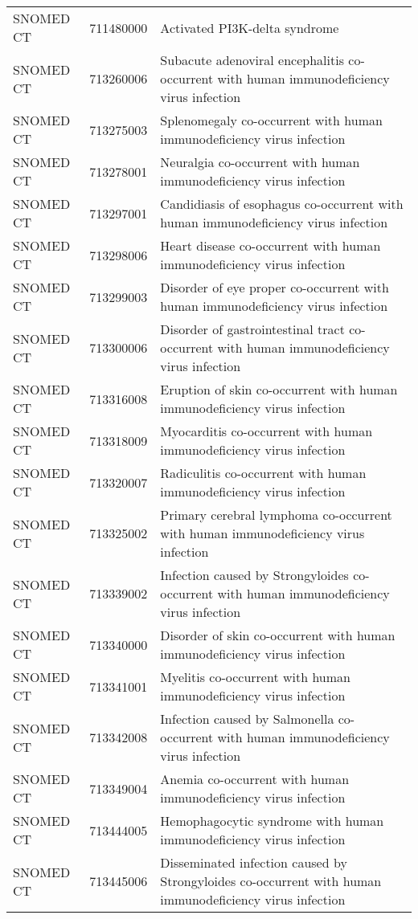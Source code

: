 \begin{table}[ht]
\begin{tabular}{lll}
  SNOMED CT & 711480000 & Activated PI3K-delta syndrome \\ 
  SNOMED CT & 713260006 & Subacute adenoviral encephalitis co-occurrent with human immunodeficiency virus infection \\ 
  SNOMED CT & 713275003 & Splenomegaly co-occurrent with human immunodeficiency virus infection \\ 
  SNOMED CT & 713278001 & Neuralgia co-occurrent with human immunodeficiency virus infection \\ 
  SNOMED CT & 713297001 & Candidiasis of esophagus co-occurrent with human immunodeficiency virus infection \\ 
  SNOMED CT & 713298006 & Heart disease co-occurrent with human immunodeficiency virus infection \\ 
  SNOMED CT & 713299003 & Disorder of eye proper co-occurrent with human immunodeficiency virus infection \\ 
  SNOMED CT & 713300006 & Disorder of gastrointestinal tract co-occurrent with human immunodeficiency virus infection \\ 
  SNOMED CT & 713316008 & Eruption of skin co-occurrent with human immunodeficiency virus infection \\ 
  SNOMED CT & 713318009 & Myocarditis co-occurrent with human immunodeficiency virus infection \\ 
  SNOMED CT & 713320007 & Radiculitis co-occurrent with human immunodeficiency virus infection \\ 
  SNOMED CT & 713325002 & Primary cerebral lymphoma co-occurrent with human immunodeficiency virus infection \\ 
  SNOMED CT & 713339002 & Infection caused by Strongyloides co-occurrent with human immunodeficiency virus infection \\ 
  SNOMED CT & 713340000 & Disorder of skin co-occurrent with human immunodeficiency virus infection \\ 
  SNOMED CT & 713341001 & Myelitis co-occurrent with human immunodeficiency virus infection \\ 
  SNOMED CT & 713342008 & Infection caused by Salmonella co-occurrent with human immunodeficiency virus infection \\ 
  SNOMED CT & 713349004 & Anemia co-occurrent with human immunodeficiency virus infection \\ 
  SNOMED CT & 713444005 & Hemophagocytic syndrome with human immunodeficiency virus infection \\ 
  SNOMED CT & 713445006 & Disseminated infection caused by Strongyloides co-occurrent with human immunodeficiency virus infection \\ 

\end{tabular}
\end{table}
